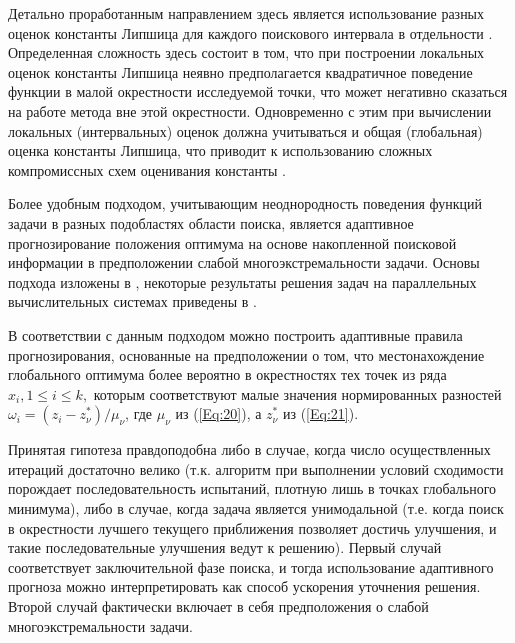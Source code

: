 \documentclass[
11pt,%
tightenlines,%
twoside,%
onecolumn,%
nofloats,%
nobibnotes,%
nofootinbib,%
superscriptaddress,%
noshowpacs,%
centertags]%
{revtex4}
\begin{document}
Детально проработанным направлением здесь является использование разных оценок константы Липшица для каждого поискового интервала в отдельности \cite{Sergeyev2003,Sergeyev2007}. Определенная сложность здесь состоит в том, что при построении локальных оценок константы Липшица неявно предполагается квадратичное поведение функции в малой окрестности исследуемой точки, что может негативно сказаться на работе метода вне этой окрестности. 
Одновременно с этим при вычислении локальных (интервальных) оценок должна учитываться и общая (глобальная) оценка константы Липшица, что приводит к использованию сложных компромиссных схем оценивания константы \cite{Sergeyev2020}.

Более удобным подходом, учитывающим неоднородность поведения функций задачи в разных подобластях области поиска,  является адаптивное прогнозирование положения оптимума на основе накопленной поисковой информации в предположении слабой многоэкстремальности задачи. Основы подхода изложены в \cite{Strongin2000}, некоторые результаты решения задач на параллельных вычислительных системах приведены в \cite{Barkalov2010}.

В соответствии с данным подходом можно построить адаптивные правила прогнозирования, основанные на предположении о том, что местонахождение глобального оптимума более вероятно в окрестностях тех точек из ряда $x_i, 1 \leq i \leq k,$ которым соответствуют малые значения нормированных разностей $\omega_i=(z_i-z_\nu^*)/\mu_\nu$, где $\mu_\nu$ из (\ref{Eq:20}), а $z_\nu^*$ из (\ref{Eq:21}).

Принятая гипотеза правдоподобна либо в случае, когда число осуществленных итераций достаточно велико (т.к. алгоритм при выполнении условий сходимости порождает последовательность испытаний, плотную лишь в точках глобального минимума), либо в случае, когда задача является унимодальной (т.е. когда поиск в окрестности лучшего текущего приближения позволяет достичь улучшения, и такие последовательные улучшения ведут к решению). Первый случай соответствует заключительной фазе поиска, и тогда использование адаптивного прогноза можно интерпретировать как способ ускорения уточнения решения. Второй случай фактически включает в себя предположения о слабой многоэкстремальности задачи.
\end{document}
